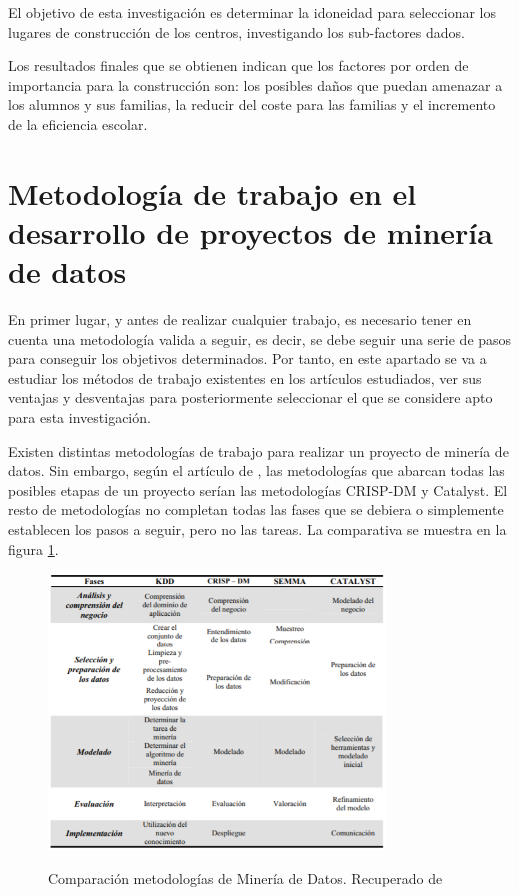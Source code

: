 El objetivo de esta investigación es determinar la idoneidad para seleccionar los lugares de construcción de los centros, investigando los sub-factores dados.

Los resultados finales que se obtienen indican que los factores por orden de importancia para la construcción son: los posibles daños que puedan amenazar a los alumnos y sus familias, la reducir del coste para las familias y el incremento de la eficiencia escolar.

\section{Metodología de trabajo en el desarrollo de proyectos de minería de datos}
En primer lugar, y antes de realizar cualquier trabajo, es necesario tener en cuenta una metodología valida a seguir, es decir, se debe seguir una serie de pasos para conseguir los objetivos determinados. Por tanto, en este apartado se va a estudiar los métodos de trabajo existentes en los artículos estudiados, ver sus ventajas y desventajas para posteriormente seleccionar el que se considere apto para esta investigación.

Existen distintas metodologías de trabajo para realizar un proyecto de minería de datos. Sin embargo, según el artículo de , las metodologías que abarcan todas las posibles etapas de un proyecto serían las metodologías CRISP-DM y Catalyst. El resto de metodologías no completan todas las fases que se debiera o simplemente establecen los pasos a seguir, pero no las tareas. La comparativa se muestra en la figura \ref{fig:compMod}.

\begin{figure}[htb]
	\centering
	\caption{
		Comparación metodologías de Minería de Datos. Recuperado de \protect{}
	}
	\includegraphics[width=0.8\textwidth]{recursos/ComparacionModelosDM}
	\label{fig:compMod}
\end{figure}
\FloatBarrier


